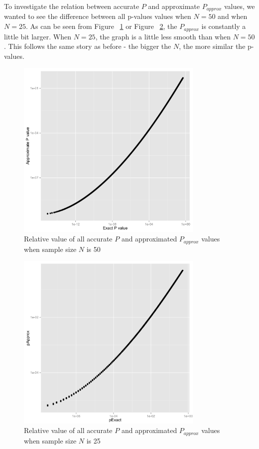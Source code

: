 \documentclass[12pt]{article}
\begin{document}
\newpage

To investigate the relation between accurate $P$ and approximate $P_{approx}$ values, we wanted to see the difference between all p-values values when $N = 50$ and when $N = 25$. As can be seen from Figure ~\ref{fig:PvsP50} or Figure ~\ref{fig:PvsP25}, the $P_{approx}$
is constantly a little bit larger. When $N = 25$, the graph is a little less smooth than when $N=50$. This follows the same story as before - the bigger the $N$, the more similar the p-values.

\begin{figure}[H]
  \centering
  \includegraphics[width=0.8\textwidth]{PvsP50}
  \caption{Relative value of all accurate $P$ and approximated $P_{approx}$ values when sample size $N$ is 50}
  \label{fig:PvsP50}
\end{figure}

\begin{figure}[H]
  \centering
  \includegraphics[width=0.8\textwidth]{PvsP25}
  \caption{Relative value of all accurate $P$ and approximated $P_{approx}$ values when sample size $N$ is 25}
  \label{fig:PvsP25}
\end{figure}
\end{document}
